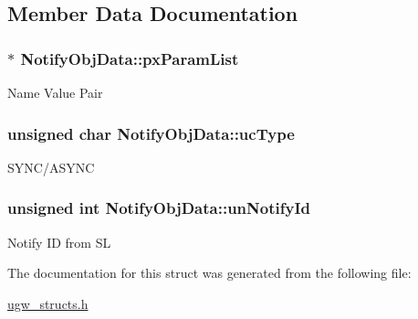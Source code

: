 \subsection{Member Data Documentation}
\hypertarget{structNotifyObjData_ae0b88ded42248e172ca4dfde653478aa}{
\subsubsection[{px\-Param\-List}]{$\ast$ Notify\-Obj\-Data\-::px\-Param\-List}}\label{structNotifyObjData_ae0b88ded42248e172ca4dfde653478aa}
Name Value Pair \hypertarget{structNotifyObjData_a1d1a9ff0a7887106467b7ea9002c9940}{
\subsubsection[{uc\-Type}]{\setlength{\rightskip}{0pt plus 5cm}unsigned char Notify\-Obj\-Data\-::uc\-Type}}\label{structNotifyObjData_a1d1a9ff0a7887106467b7ea9002c9940}
S\-Y\-N\-C/\-A\-S\-Y\-N\-C \hypertarget{structNotifyObjData_ae893026ee94e65614ead5178f71ac485}{
\subsubsection[{un\-Notify\-Id}]{\setlength{\rightskip}{0pt plus 5cm}unsigned int Notify\-Obj\-Data\-::un\-Notify\-Id}}\label{structNotifyObjData_ae893026ee94e65614ead5178f71ac485}
Notify I\-D from S\-L 

The documentation for this struct was generated from the following file\-:\begin{DoxyCompactItemize}
\item 
\hyperlink{ugw__structs_8h}{ugw\-\_\-structs.\-h}\end{DoxyCompactItemize}

